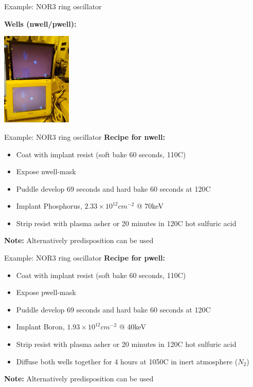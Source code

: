 \documentclass[aspectratio=169]{beamer}
\begin{document}
\begin{frame}{Example: NOR3 ring oscillator}
	\begin{center}
		\textbf{Wells (nwell/pwell):}

		\includegraphics[width=0.25\textwidth]{images/20181214_125705.jpg}
	\end{center}
\end{frame}

\begin{frame}{Example: NOR3 ring oscillator}
	\textbf{Recipe for nwell:}
	\begin{itemize}
		\item Coat with implant resist (soft bake 60 seconds, 110\textdegree{}C)
		\item Expose nwell-mask
		\item Puddle develop 69 seconds and hard bake 60 seconds at 120\textdegree{}C
		\item Implant Phosphorus, $2.33 \times 10^{12} cm^{-2}$ @ 70keV
		\item Strip resist with plasma asher or 20 minutes in 120\textdegree{}C hot sulfuric acid
	\end{itemize}
	\textbf{Note:} Alternatively predisposition can be used
\end{frame}

\begin{frame}{Example: NOR3 ring oscillator}
	\textbf{Recipe for pwell:}
	\begin{itemize}
		\item Coat with implant resist (soft bake 60 seconds, 110\textdegree{}C)
		\item Expose pwell-mask
		\item Puddle develop 69 seconds and hard bake 60 seconds at 120\textdegree{}C
		\item Implant Boron, $1.93 \times 10^{12} cm^{-2}$ @ 40keV
		\item Strip resist with plasma asher or 20 minutes in 120\textdegree{}C hot sulfuric acid
		\item Diffuse both wells together for 4 hours at 1050\textdegree{}C in inert atmosphere ($N_2$) 
	\end{itemize}
	\textbf{Note:} Alternatively predisposition can be used
\end{frame}
\end{document}
